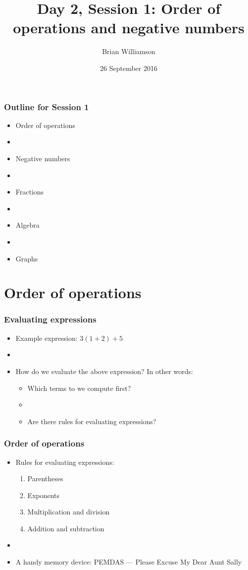 \documentclass[12pt]{beamer}
\title{Day 2, Session 1: Order of operations and negative numbers}
\author{Brian Williamson}
\institute{EPI/BIOST Bootcamp 2016}
\date{26 September 2016}
\newcommand{\myframe}[1]{\begin{frame} \frametitle{#1}}
\begin{document}
\begin{frame}
\titlepage
\end{frame}

\myframe{Outline for Session 1}
\begin{itemize}
\item Order of operations
\item[]
\item Negative numbers 
\item[]
\item Fractions
\item[]
\item Algebra
\item[]
\item Graphs
\end{itemize}
\end{frame}

\section{Order of operations}
\myframe{Evaluating expressions}
\begin{itemize}
\item Example expression: $3(1 + 2) + 5$
\item[]
\item How do we evaluate the above expression? In other words:
\begin{itemize}
\item Which terms to we compute first?
\item[]
\item Are there rules for evaluating expressions?
\end{itemize}
\end{itemize}
\end{frame}

\myframe{Order of operations}
\begin{itemize}
\item Rules for evaluating expressions:
\begin{enumerate}
\item Parentheses
\item Exponents
\item Multiplication and division
\item Addition and subtraction
\end{enumerate}
\item[]
\item A handy memory device: PEMDAS --- Please Excuse My Dear Aunt Sally
\end{itemize}
\end{frame}
\end{document}
